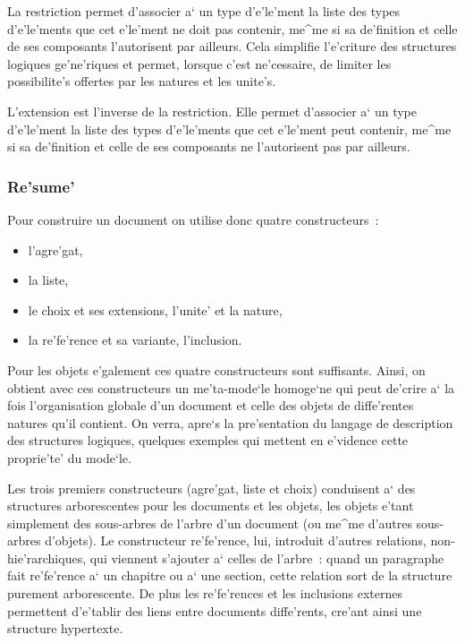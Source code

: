 La restriction permet d'associer a` un type d'e'le'ment la liste des
types d'e'le'ments que cet e'le'ment ne doit pas contenir, me^me si
sa de'finition et celle de ses composants l'autorisent par ailleurs.
Cela simplifie l'e'criture des structures logiques ge'ne'riques
et permet, lorsque c'est ne'cessaire, de limiter les possibilite's offertes
par les natures et les unite's.

L'extension est l'inverse de la restriction. Elle permet d'associer a` un
type d'e'le'ment la liste des types d'e'le'ments que cet e'le'ment peut
contenir, me^me si sa de'finition et celle de ses composants ne l'autorisent
pas par ailleurs.

\subsubsection{Re'sume'}

Pour construire un document on utilise donc quatre constructeurs~:

\begin{itemize}
\item
l'agre'gat,
\item
la liste,
\item
le choix et ses extensions, l'unite' et la nature,
\item
la re'fe'rence et sa variante, l'inclusion.
\end{itemize}

Pour les objets e'galement ces quatre constructeurs sont suffisants.
Ainsi, on obtient avec ces constructeurs un me'ta-mode`le homoge`ne qui peut
de'crire a` la fois l'organisation globale d'un document et celle des objets
de diffe'rentes natures qu'il contient. On verra, apre`s la pre'sentation du
langage de description des structures logiques, quelques exemples qui
mettent en e'vidence cette proprie'te' du mode`le.

Les trois premiers constructeurs (agre'gat, liste et choix) conduisent a`
des structures arborescentes pour les documents et les objets, les
objets e'tant simplement des sous-arbres de l'arbre d'un document (ou
me^me d'autres sous-arbres d'objets). Le constructeur re'fe'rence, lui,
introduit d'autres relations, non-hie'rarchiques, qui viennent s'ajouter a`
celles de l'arbre~: quand un paragraphe fait re'fe'rence a` un chapitre ou a`
une section, cette relation sort de la structure purement arborescente.
De plus les re'fe'rences et les inclusions externes permettent d'e'tablir
des liens entre documents diffe'rents, cre'ant ainsi une structure
hypertexte.

